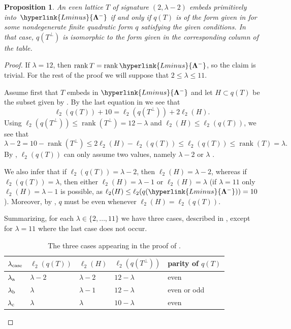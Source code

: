 \documentclass[a4paper]{amsart}
\theoremstyle{definition}
\theoremstyle{plain}
\newtheorem{proposition}[definition]{Proposition}
\DeclareMathOperator{\rank}{rank}
\newcommand{\bLambda}{\mathbf{\Lambda}}
\newcommand{\Lminus}{\hyperlink{Lminus}{\bLambda^-}}
\begin{document}
\begin{proposition} \label{prop:T-embedding-in-Lminus}
An even lattice \(T\) of signature \((2, \lambda - 2)\) embeds primitively into~\(\Lminus\) if and only if \(q(T)\) is of the form given in  for some nondegenerate finite quadratic form \(q\) satisfying the given conditions. 
In that case, \(q(T^\perp)\) is isomorphic to the form given in the corresponding column of the table.
\end{proposition}

\begin{proof} 
If \(\lambda = 12\), then \(\rank T = \rank \Lminus\), so the claim is trivial. For the rest of the proof we will suppose that \(2 \leq \lambda \leq 11\).

Assume first that \(T\) embeds in \(\Lminus\) and let \(H \subset q(T)\) be the subset given by .
By the last equation in  we see that
\[
 \ell_2(q(T)) + 10 = \ell_2(q(T^\perp)) + 2\ell_2(H).
\]
Using \(\ell_2(q(T^\perp)) \leq \rank(T^\perp) = 12 - \lambda\) and \(\ell_2(H) \leq \ell_2(q(T))\), we see that
\[
 \lambda -2 = 10 - \rank(T^\perp)\leq 2\ell_2(H)-\ell_2(q(T)) \leq \ell_2(q(T)) \leq \rank(T) = \lambda.
\]
By , \(\ell_2(q(T))\) can only assume two values, namely \(\lambda - 2\) or \(\lambda\) . 

We also infer that if \(\ell_2(q(T)) = \lambda -2\), then \(\ell_2(H) = \lambda - 2\), 
whereas if \(\ell_2(q(T)) = \lambda\), then either \(\ell_2(H) = \lambda -1\) or \(\ell_2(H) = \lambda\) 
(if \(\lambda = 11\) only \(\ell_2(H) = \lambda -1\) is possible, as \(\ell_2(H) \leq \ell_2(q(\Lminus)) = 10\)).
Moreover, by , \(q\) must be even whenever \(\ell_2(H) = \ell_2(q(T))\).

Summarizing, for each \(\lambda \in \{2, \ldots, 11 \}\) we have three cases, described in , except for \(\lambda = 11\) where the last case does not occur.

\begin{table}
\caption{The three cases appearing in the proof of .}
\label{tab:cases}
\begin{tabular}{lllll}
 \toprule
 \(\lambda_{\rm case}\) & \(\ell_2(q(T))\) & \(\ell_2(H)\) & \(\ell_2(q(T^\perp))\) & parity of \(q(T)\) \\
 \midrule
 \(\lambda_{\rm a}\) & \(\lambda - 2\) & \(\lambda - 2\) & \(12 - \lambda\) & even \\
 \(\lambda_{\rm b}\) & \(\lambda\) & \(\lambda - 1\) & \(12 - \lambda\) & even or odd \\
 \(\lambda_{\rm c}\) & \(\lambda\) & \(\lambda\) & \(10 - \lambda\) & even \\
 \bottomrule
\end{tabular}
\end{table}


\end{proof}
\end{document}
